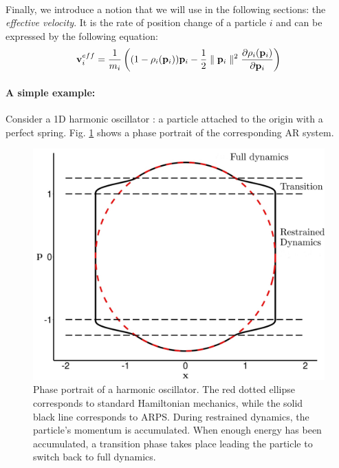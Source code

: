 \paragraph*{}
Finally, we introduce a notion that we will use in the following sections: the \textit{effective velocity}. It is the rate of position change of a particle $i$ and can be expressed by the following equation:
\begin{equation}
    \label{eq:adaptiveVelocity}
    \mathbf{v}_{i}^{eff} = \frac{1}{m_{i}} \left( (1-\rho_{i}(\mathbf{p}_{i}))\mathbf{p}_{i} - \frac{1}{2} \parallel \mathbf{p}_{i} \parallel^2 \frac{\partial \rho_{i}(\mathbf{p}_{i})}{\partial \mathbf{p}_{i}}\right)
\end{equation}

\paragraph*{A simple example:}
Consider a 1D harmonic oscillator : a particle attached to the origin with a perfect spring.
Fig. \ref{fig:harmonicOscillatorPhasePortrait} shows a phase portrait of the corresponding
AR system.

\begin{figure}[!h]
	\centering
	\includegraphics[width=0.8\linewidth]{images/arps-vriphys2013/harmonicOscillatorPhasePortraitraw_hacked.png}
	\caption[ARPS: Phase portrait of a ARPS harmonic oscillator]{\label{fig:harmonicOscillatorPhasePortrait} Phase portrait of a harmonic oscillator. The red dotted ellipse corresponds to standard Hamiltonian mechanics, while the solid black line corresponds to ARPS. During restrained dynamics, the particle's momentum is accumulated. When enough energy has been accumulated, a transition phase takes place leading the particle to switch back to full dynamics.}
\end{figure}

